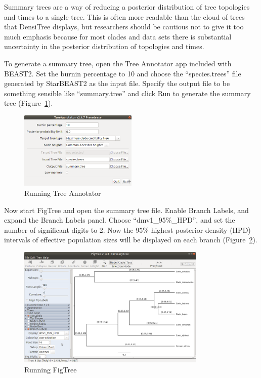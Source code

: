 \documentclass[12pt]{article}
\begin{document}
Summary trees are a way of reducing a posterior distribution of tree
topologies and times to a single tree. This is often more readable than the
cloud of trees that DensiTree displays, but researchers should be cautious not
to give it too much emphasis because for most clades and data
sets there is substantial uncertainty in the posterior distribution of
topologies and times.

To generate a summary tree, open the Tree Annotator app included with BEAST2.
Set the burnin percentage to 10 and choose the ``species.trees'' file generated by
StarBEAST2 as the input file. Specify the output file to be something sensible
like ``summary.tree'' and click Run to generate the summary tree
(Figure~\ref{fig:treeAnnotator}).

\begin{figure}[htb!]
\centering
\includegraphics[width=0.5\textwidth]{figures/treeAnnotator.png}
\caption
{Running Tree Annotator}
\label{fig:treeAnnotator}
\end{figure}

Now start FigTree and open the summary tree file. Enable Branch Labels,
and expand the Branch Labels panel. Choose ``dmv1\_95\%\_HPD'', and set
the number of significant digits to 2. Now the 95\% highest posterior
density (HPD) intervals of
effective population sizes will be displayed on each branch
(Figure~\ref{fig:figtree}).

\begin{figure}[htb!]
\centering
\includegraphics[width=0.8\textwidth]{figures/figtree.png}
\caption
{Running FigTree}
\label{fig:figtree}
\end{figure}
\end{document}

